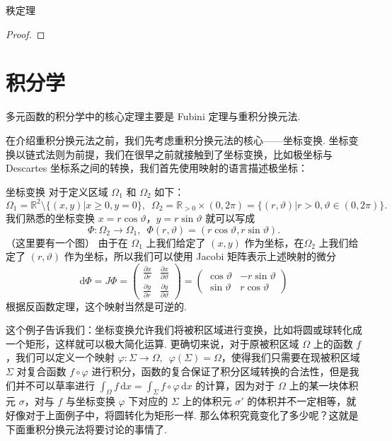 \begin{theorem}{秩定理}{}
    
\end{theorem}

\begin{proof}

\end{proof}

\section{积分学}

多元函数的积分学中的核心定理主要是 Fubini 定理与重积分换元法.

在介绍重积分换元法之前，我们先考虑重积分换元法的核心——坐标变换. 坐标变换以链式法则为前提，我们在很早之前就接触到了坐标变换，比如极坐标与 Descartes 坐标系之间的转换，我们首先使用映射的语言描述极坐标：

\begin{example}{坐标变换}{}
    对于定义区域 $\Omega_1$ 和 $\Omega_2$ 如下：
    \[\Omega_1 = \mathbb{R}^2\setminus\{(x, y)\vert x\geqslant 0, y = 0\},\enspace \Omega_2 = \mathbb{R}_{>0}\times (0, 2\pi) = \{(r, \vartheta)\vert r>0, \vartheta\in(0, 2\pi)\}.\]
    我们熟悉的坐标变换 $x = r\cos\vartheta$，$y = r\sin\vartheta$ 就可以写成 \[\Phi: \Omega_2\to\Omega_1,\enspace \Phi(r, \vartheta) = (r\cos\vartheta, r\sin\vartheta).\]（这里要有一个图）
    由于在 $\Omega_1$ 上我们给定了 $(x, y)$ 作为坐标，在$\Omega_2$ 上我们给定了 $(r, \vartheta)$ 作为坐标，所以我们可以使用 Jacobi 矩阵表示上述映射的微分
    \[
        \mathrm{d}\Phi = J\Phi = \begin{pmatrix}
            \frac{\partial x}{\partial r} & \frac{\partial x}{\partial \vartheta} \\
            \frac{\partial y}{\partial r} & \frac{\partial y}{\partial \vartheta}
        \end{pmatrix} = \begin{pmatrix}
            \cos\vartheta & -r\sin\vartheta \\
            \sin\vartheta & r\cos\vartheta
        \end{pmatrix}
    \]
    根据反函数定理，这个映射当然是可逆的.
\end{example}

这个例子告诉我们：坐标变换允许我们将被积区域进行变换，比如将圆或球转化成一个矩形，这样就可以极大简化运算. 更确切来说，对于原被积区域 $\Omega$ 上的函数 $f$，我们可以定义一个映射 $\varphi: \Sigma \to \Omega,\enspace \varphi(\Sigma) = \Omega$，使得我们只需要在现被积区域 $\Sigma$ 对复合函数 $f\circ\varphi$ 进行积分，函数的复合保证了积分区域转换的合法性，但是我们并不可以草率进行 $\displaystyle\int_{\Omega}f\,\mathrm{d}x = \displaystyle\int_{\Sigma}f\circ \varphi\,\mathrm{d}x$ 的计算，因为对于 $\Omega$ 上的某一块体积元 $\sigma$，对与 $f$ 与坐标变换 $\varphi$ 下对应的 $\Sigma$ 上的体积元 $\sigma'$ 的体积并不一定相等，就好像对于上面例子中，将圆转化为矩形一样. 那么体积究竟变化了多少呢？这就是下面重积分换元法将要讨论的事情了.

